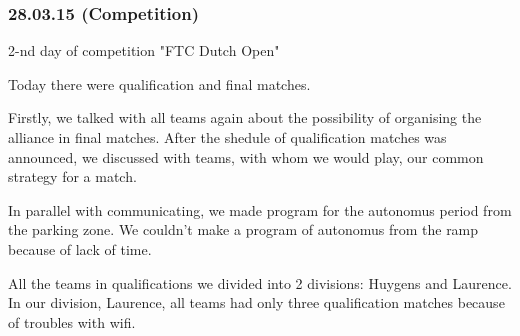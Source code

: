 \subsubsection{28.03.15 (Competition)}
\begin{center}
	2-nd day of competition "FTC Dutch Open"
\end{center}
Today there were qualification and final matches.\newline

Firstly, we talked with all teams again about the possibility of organising the alliance in final matches. After the shedule of qualification matches was announced, we discussed with teams, with whom we would play, our common strategy for a match.\newline

In parallel with communicating, we made program for the autonomus period from the parking zone. We couldn't make a program of autonomus from the ramp because of lack of time.\newline

All the teams in qualifications we divided into 2 divisions: Huygens and Laurence. In our division, Laurence, all teams had only three qualification matches because of troubles with wifi.\newline

